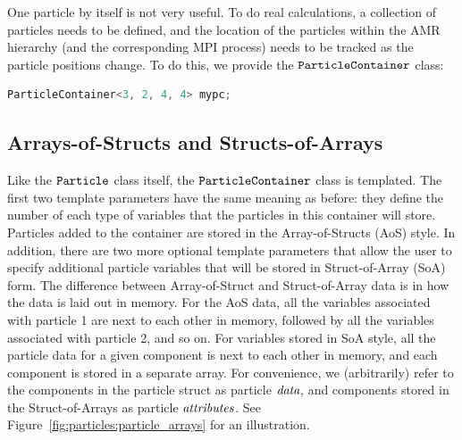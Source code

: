 One particle by itself is not very useful. To do real calculations, a collection of particles needs to be defined, and the location of the particles within the AMR hierarchy
(and the corresponding MPI process) needs to be tracked as the particle positions change. To do this, we provide the $\tt{ParticleContainer}$ class:

\begin{lstlisting}[language=cpp]
  ParticleContainer<3, 2, 4, 4> mypc;
\end{lstlisting}
   
\subsection{Arrays-of-Structs and Structs-of-Arrays}

Like the $\tt{Particle}$ class itself, the $\tt{ParticleContainer}$ class is templated. The first two template parameters have the same meaning as before: they define the number of each type of variables that the particles in this container will store. Particles added to the container are stored in the Array-of-Structs (AoS) style. In addition, there are two more optional template parameters that allow the user to specify additional particle variables that will be stored in Struct-of-Array (SoA) form. The difference between Array-of-Struct and Struct-of-Array data is in how the data is laid out in memory. For the AoS data, all the variables associated with particle 1 are next to each other in memory, followed by all the variables associated with particle 2, and so on. For variables stored in SoA style, all the particle data for a given component is next to each other in memory, and each component is stored in a separate
array. For convenience, we (arbitrarily) refer to the components in the particle struct as particle $\emph{data}$, and components stored in the Struct-of-Arrays as particle
$\emph{attributes}$. See Figure~\ref{fig:particles:particle_arrays} for an illustration.

